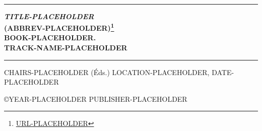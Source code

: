 \documentclass[a4paper,11pt,oneside,french]{book}
\newif\ifbackground
\newif\iflogo
\newif\ifcredits
\newif\ifsponsors
\newif\ifmessage
\newif\ifpreface
\newif\ifcommittee
\renewcommand{\headrulewidth}{0pt}
\newlength{\drop}%
\newcommand*{\plogo}{%
  \texttt{[image: logo.png]}
}
\newcommand*{\titleUL}{\begingroup%
  \drop=0.1\textheight
  \vspace*{\drop}
  \begin{center}
    {\LARGE \textsc{~~~~~}}\\[\drop]
    \iflogo
        {\LARGE \plogo}\\[2ex]
    \fi
    \rule{\textwidth}{1pt}\par
    \vspace{0.5\baselineskip}
    {\Large\bfseries \textsl{TITLE-PLACEHOLDER} \\(ABBREV-PLACEHOLDER)\footnote{\url{URL-PLACEHOLDER}}\\[2ex]
      \large BOOK-PLACEHOLDER. \\[1ex]
      \large TRACK-NAME-PLACEHOLDER}\\[2ex]
    \rule{\textwidth}{1pt}\par
    \vspace{1ex}
    \vfill
    CHAIRS-PLACEHOLDER (\'Eds.) 
    \vfill
    LOCATION-PLACEHOLDER, DATE-PLACEHOLDER \\[1ex]
  \end{center}
\endgroup}
\begin{document}
\titleUL

\renewcommand{\headrulewidth}{0pt}
\renewcommand{\footrulewidth}{0pt}

\thispagestyle{empty}

\ifbackground
\ThisULCornerWallPaper{1}{background.png}
\fi

\clearpage

\thispagestyle{empty}
\mbox{}
\vfill
\ifcredits


\fi
\large
\noindent
\copyright YEAR-PLACEHOLDER PUBLISHER-PLACEHOLDER 
\hspace*{6.5mm} \\

\clearpage

\thispagestyle{empty}

\ifsponsors
\section*{Avec le soutien de}
\vspace*{0.5cm}

\begin{center}
\texttt{[image: sponsors.png]}
\end{center}
\fi

\clearpage

\ifmessage
\pdfbookmark{Message}{message}



\clearpage
\fi
\ifpreface
\pdfbookmark{Pr\'eface}{preface}

\section*{Pr\'eface}
\vspace*{0.5cm}



\clearpage
\fi
\ifcommittee
{}
\end{document}
